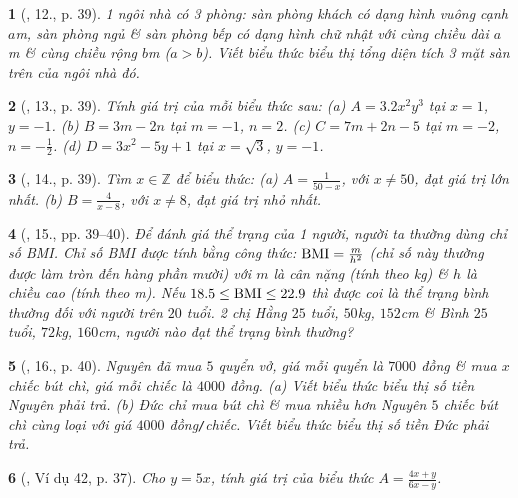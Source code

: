 \documentclass{article}
\newtheorem{baitoan}{}
\begin{document}
\begin{baitoan}[\cite{SBT_Toan_7_Canh_Dieu_tap_2}, 12., p. 39]
	1 ngôi nhà có 3 phòng: sàn phòng khách có dạng hình vuông cạnh $a$\emph{m}, sàn phòng ngủ \& sàn phòng bếp có dạng hình chữ nhật với cùng chiều dài $a$\emph{m} \& cùng chiều rộng $b$\emph{m} ($a > b$). Viết biểu thức biểu thị tổng diện tích 3 mặt sàn trên của ngôi nhà đó.
\end{baitoan}

\begin{baitoan}[\cite{SBT_Toan_7_Canh_Dieu_tap_2}, 13., p. 39]
	Tính giá trị của mỗi biểu thức sau: (a) $A = 3.2x^2y^3$ tại $x = 1$, $y = -1$. (b) $B = 3m - 2n$ tại $m = -1$, $n = 2$. (c) $C = 7m + 2n - 5$ tại $m = -2$, $n = -\frac{1}{2}$. (d) $D = 3x^2 - 5y + 1$ tại $x = \sqrt{3}$, $y = -1$.
\end{baitoan}

\begin{baitoan}[\cite{SBT_Toan_7_Canh_Dieu_tap_2}, 14., p. 39]
	Tìm $x\in\mathbb{Z}$ để biểu thức: (a) $A = \frac{1}{50 - x}$, với $x\ne50$, đạt giá trị lớn nhất. (b) $B = \frac{4}{x - 8}$, với $x\ne8$, đạt giá trị nhỏ nhất.
\end{baitoan}

\begin{baitoan}[\cite{SBT_Toan_7_Canh_Dieu_tap_2}, 15., pp. 39--40]
	Để đánh giá thể trạng của 1 người, người ta thường dùng chỉ số BMI. Chỉ số BMI được tính bằng công thức: ${\rm BMI} = \frac{m}{h^2}$ (chỉ số này thường được làm tròn đến hàng phần mười) với $m$ là cân nặng (tính theo \emph{kg}) \& $h$ là chiều cao (tính theo \emph{m}). Nếu $18.5\le{\rm BMI}\le22.9$ thì được coi là thể trạng bình thường đối với người trên $20$ tuổi. 2 chị Hằng $25$ tuổi, $50$\emph{kg}, $152$\emph{cm} \& Bình $25$ tuổi, $72$\emph{kg}, $160$\emph{cm}, người nào đạt thể trạng bình thường?
\end{baitoan}

\begin{baitoan}[\cite{SBT_Toan_7_Canh_Dieu_tap_2}, 16., p. 40]
	Nguyên đã mua $5$ quyển vở, giá mỗi quyển là $7000$ đồng \& mua $x$ chiếc bút chì, giá mỗi chiếc là $4000$ đồng. (a) Viết biểu thức biểu thị số tiền Nguyên phải trả. (b) Đức chỉ mua bút chì \& mua nhiều hơn Nguyên $5$ chiếc bút chì cùng loại với giá $4000$ \emph{đồng\texttt{/}chiếc}. Viết biểu thức biểu thị số tiền Đức phải trả.
\end{baitoan}

\begin{baitoan}[\cite{Tuyen_Toan_7}, Ví dụ 42, p. 37]
	Cho $y = 5x$, tính giá trị của biểu thức $A = \frac{4x + y}{6x - y}$.
\end{baitoan}
\end{document}
